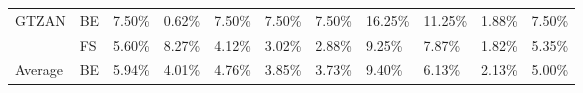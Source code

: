 \begin{table}[H]
{\begin{tabular}{lllllllllll}
    \multirow{-2}{*}{GTZAN}   & \multicolumn{1}{l|}{\cellcolor[HTML]{EFEFEF}BE} & \cellcolor[HTML]{EFEFEF}7.50\% & \cellcolor[HTML]{EFEFEF}0.62\% & \cellcolor[HTML]{EFEFEF}7.50\% & \cellcolor[HTML]{EFEFEF}7.50\% & \cellcolor[HTML]{EFEFEF}7.50\% & \cellcolor[HTML]{EFEFEF}16.25\% & \cellcolor[HTML]{EFEFEF}11.25\% & \cellcolor[HTML]{EFEFEF}1.88\% & \cellcolor[HTML]{EFEFEF}7.50\% \\ \cline{1-2}
                              & \multicolumn{1}{l|}{FS}                         & 5.60\%                         & 8.27\%                         & 4.12\%                         & 3.02\%                         & 2.88\%                         & 9.25\%                          & 7.87\%                          & 1.82\%                         & 5.35\%                         \\
    \multirow{-2}{*}{Average} & \multicolumn{1}{l|}{\cellcolor[HTML]{EFEFEF}BE} & \cellcolor[HTML]{EFEFEF}5.94\% & \cellcolor[HTML]{EFEFEF}4.01\% & \cellcolor[HTML]{EFEFEF}4.76\% & \cellcolor[HTML]{EFEFEF}3.85\% & \cellcolor[HTML]{EFEFEF}3.73\% & \cellcolor[HTML]{EFEFEF}9.40\%  & \cellcolor[HTML]{EFEFEF}6.13\%  & \cellcolor[HTML]{EFEFEF}2.13\% & \cellcolor[HTML]{EFEFEF}5.00\%
    \end{tabular}}
\end{table}

